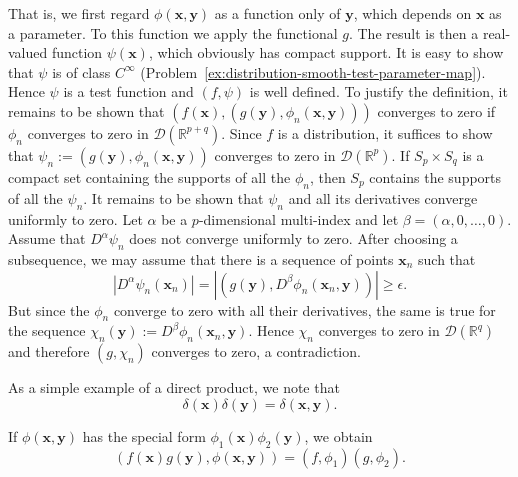 That is, we first regard $\phi(\bm{x},\bm{y})$ as a function only of $\bm{y}$, which depends on $\bm{x}$ as a parameter. To this function we apply the functional $g$. The result is then a real-valued function $\psi(\bm{x})$, which obviously has compact support. It is easy to show that $\psi$ is of class $C^\infty$ (Problem~\ref{ex:distribution-smooth-test-parameter-map}). Hence $\psi$ is a test function and $(f,\psi)$ is well defined. To justify the definition, it remains to be shown that $(f(\bm{x}),(g(\bm{y}),\phi_n(\bm{x},\bm{y})))$ converges to zero if $\phi_n$ converges to zero in $\mathcal{D}(\mathbb{R}^{p+q})$. Since $f$ is a distribution, it suffices to show that $\psi_n:=(g(\bm{y}),\phi_n(\bm{x},\bm{y}))$ converges to zero in $\mathcal{D}(\mathbb{R}^p)$. If $S_p\times S_q$ is a compact set containing the supports of all the $\phi_n$, then $S_p$ contains the supports of all the $\psi_n$. It remains to be shown that $\psi_n$ and all its derivatives converge uniformly to zero. Let $\alpha$ be a $p$-dimensional multi-index and let $\beta=(\alpha,0,\ldots,0)$. Assume that $D^\alpha\psi_n$ does not converge uniformly to zero. After choosing a subsequence, we may assume that there is a sequence of points $\bm{x}_n$ such that
\begin{equation}\label{eq:direct-product-continuity-contradiction}
|D^\alpha\psi_n(\bm{x}_n)|=|(g(\bm{y}),D^\beta\phi_n(\bm{x}_n,\bm{y}))|\geq\epsilon.
\end{equation}
But since the $\phi_n$ converge to zero with all their derivatives, the same is true for the sequence $\chi_n(\bm{y}):=D^\beta\phi_n(\bm{x}_n,\bm{y})$. Hence $\chi_n$ converges to zero in $\mathcal{D}(\mathbb{R}^q)$ and therefore $(g,\chi_n)$ converges to zero, a contradiction.

\begin{Example}
\label{ex:direct-product-delta}
As a simple example of a direct product, we note that \[\delta(\bm{x})\delta(\bm{y})=\delta(\bm{x},\bm{y}).\]
\end{Example}

If $\phi(\bm{x},\bm{y})$ has the special form $\phi_1(\bm{x})\phi_2(\bm{y})$, we obtain
\begin{equation}\label{eq:direct-product-separable-test-pairing}
(f(\bm{x})g(\bm{y}),\phi(\bm{x},\bm{y}))=(f,\phi_1)(g,\phi_2).
\end{equation}


